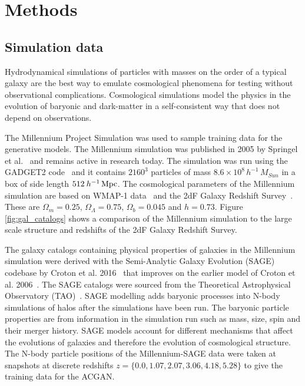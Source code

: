 \documentclass[twocolumn]{article}
\numberwithin{equation}{section}
\begin{document}

\section{Methods}\label{sec:methods}

\subsection{Simulation data}
Hydrodynamical simulations of particles with masses on the order of a typical galaxy are the best way to emulate cosmological phenomena for testing without observational complications. Cosmological simulations model the physics in the evolution of baryonic and dark-matter in a self-consistent way that does not depend on observations.

The Millennium Project Simulation was used to sample training data for the generative models. The Millennium simulation was published in 2005 by Springel et al.~\cite{millsim} and remains active in research today. The simulation was run using the GADGET2 code~\cite{gadget2} and it contains $2160^3$ particles of mass $8.6 \times 10^8 \, h^{-1}  \, M_{Sun}$ in a box of side length $512  \: h^{-1} \,\textup{Mpc}$. The cosmological parameters of the Millennium simulation are based on WMAP-1 data~\cite{wmap1} and the 2dF Galaxy Redshift Survey~\cite{2df}. These are $\Omega_m=0.25$, $\Omega_{\Lambda}=0.75$, $\Omega_b=0.045$ and $h=0.73$. Figure \ref{fig:gal_catalogs} shows a comparison of the Millennium simulation to the large scale structure and redshifts of the 2dF Galaxy Redshift Survey. 

The galaxy catalogs containing physical properties of galaxies in the Millennium simulation were derived with the Semi-Analytic Galaxy Evolution (SAGE) codebase by Croton et al. 2016~\cite{Croton2016} that improves on the earlier model of Croton et al. 2006~\cite{Croton2006}. The SAGE catalogs were sourced from the Theoretical Astrophysical Observatory (TAO)~\cite{TAO}. SAGE modelling adds baryonic processes into N-body simulations of halos after the simulations have been run. The baryonic particle properties are from information in the simulation run such as mass, size, spin and their merger history. SAGE models account for different mechanisms that affect the evolutions of galaxies and therefore the evolution of cosmological structure. The N-body particle positions of the Millennium-SAGE data were taken at snapshots at discrete redshifts $z=\{0.0, 1.07, 2.07, 3.06, 4.18, 5.28\}$ to give the training data for the ACGAN. 
\end{document}
